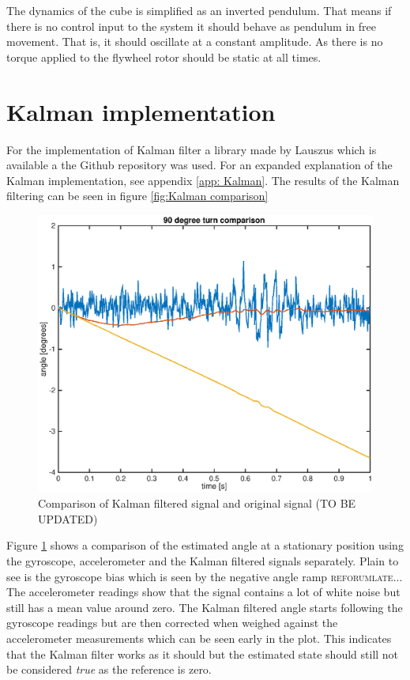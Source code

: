 \documentclass[a4paper,11pt]{kth-mag}
\begin{document}
The dynamics of the cube is simplified as an inverted pendulum. That means if there is no control input to the system it should behave as pendulum in free movement. That is, it should oscillate at a constant amplitude. As there is no torque applied to the flywheel rotor should be static at all times.

\section{Kalman implementation}
For the implementation of Kalman filter a library made by Lauszus which is available a the Github repository was used\cite{TKJkalman}. For an expanded explanation of the Kalman implementation, see appendix \ref{app: Kalman}. The results of the Kalman filtering can be seen in figure \ref{fig:Kalman comparison} 

\begin{figure}[!htb]
\centering
\includegraphics[width = \textwidth]{Kalmancomparisonstat.eps}
\caption{Comparison of Kalman filtered signal and original signal (TO BE UPDATED)}
\label{Fig: Kalman comparison}
\end{figure}

Figure \ref{Fig: Kalman comparison} shows a comparison of the estimated angle at a stationary position using the gyroscope, accelerometer and the Kalman filtered signals separately. Plain to see is the gyroscope bias which is seen by the negative angle ramp \textsc{reforumlate..}. The accelerometer readings show that the signal contains a lot of white noise but still has a mean value around zero. 
The Kalman filtered angle starts following the gyroscope readings but are then corrected when weighed against the accelerometer measurements which can be seen early in the plot. 
This indicates that the Kalman filter works as it should but the estimated state should still not be considered \textit{true} as the reference is zero. 
\end{document}
